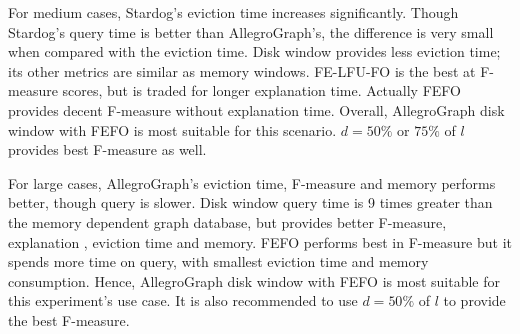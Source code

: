 For medium cases, Stardog's eviction time increases significantly.
Though Stardog's query time is better than AllegroGraph's, the difference is very small when compared with the eviction time.
Disk window provides less eviction time; its other metrics are similar as memory windows.
FE-LFU-FO is the best at F-measure scores, but is traded for longer explanation time.
Actually FEFO provides decent F-measure without explanation time.
Overall, AllegroGraph disk window with FEFO is most suitable for this scenario.
$d=50\%$ or $75\%$ of $l$ provides best F-measure as well.

For large cases, AllegroGraph's eviction time, F-measure and memory performs better, though query is slower.
Disk window query time is 9 times greater than the memory dependent graph database, but provides better F-measure, explanation , eviction time and memory. 
FEFO performs best in F-measure but it spends more time on query, with smallest eviction time and memory consumption. 
Hence, AllegroGraph disk window with FEFO is most suitable for this experiment's use case. It is also recommended to use $d = 50\% $ of $l$ to provide the best F-measure.
%
